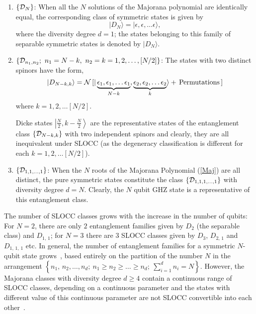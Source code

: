 \documentclass[pra,preprint,a4paper,superscriptaddress]{revtex4}
\begin{document}
{\begin{enumerate}
\item $\{{\cal D}_N\}$: When all the $N$ solutions of the Majorana polynomial are identically equal, the corresponding class of  symmetric states is given by 
\begin{equation}
\vert D_N\rangle=\vert \epsilon,\epsilon,\ldots \epsilon\rangle,
\end{equation} 
where the diversity degree  $d=1$; the states belonging to this family of 
separable symmetric states  is denoted by $\vert D_N \rangle$.  

\item $\{{\cal D}_{n_1,n_2};\ n_1=N-k,\ n_2=k=1,2,\ldots, [N/2]\}$: The  states with two distinct spinors have the form, 
\begin{equation}
\label{n1n2}
\vert D_{N-k,k}\rangle={\cal N}\,[\vert \underbrace{\epsilon_1, \epsilon_1,\ldots 
\epsilon_1}_{N-k}, \underbrace{\epsilon_2, \epsilon_2,\ldots \epsilon_2}_{k}\rangle+{\rm \, Permutations\,}]
\end{equation} 
where $k=1,2, \ldots [N/2]$.  

Dicke states $\left\vert \frac{N}{2}, k-\frac{N}{2}\right\rangle$ are the representative states of the entanglement class 
$\{{\cal D}_{N-k,k}\}$ with two independent spinors  and clearly, they 
are all inequivalent under  SLOCC (as the degeneracy classification  is different for each $k=1,2, \ldots [N/2]$).     

\item $\{{\cal D}_{1,1,\ldots, 1}\}$:  When the $N$ roots of the Majorana Polynomial (\ref{Maj}) are all distinct,
the pure symmetric states constitute  the class $\{ {\cal D}_{1,1,1,\ldots, 1}\}$ with diversity degree  $d=N$. Clearly, the $N$ qubit GHZ state is a representative of this entanglement class. 
\end{enumerate}
\noindent The number of SLOCC classes  grows  with the increase in the number of qubits: For $N=2$, there are only $2$ entanglement families given by 
$D_{2}$ (the separable class) and $D_{1,\,1}$; for $N=3$ there are $3$ SLOCC classes given by $D_{3}$, $D_{2,\,1}$ and $D_{1,\,1,\,1} $ etc.  In general, the number of entanglement families for a symmetric $N$-qubit state grows~\cite{solano}, based entirely on the partition of the number $N$ in the arrangement $\left\{n_1,\,n_2,\ldots ,n_d;\ n_1\geq n_2\geq\ldots\geq n_d;\   \sum_{i=1}^{d} 
n_i=N\right\}$. However, the Majorana classes  with diversity degree $d\geq 4$ contain a continuous range of SLOCC classes, depending on a continuous  parameter and the states with different value of this continuous  parameter  are not SLOCC convertible into each other~\cite{solano}. 
   
}
\end{document}
